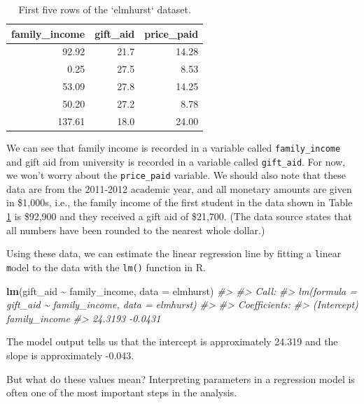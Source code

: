 \documentclass[
  10pt,
  openany]{book}
\newenvironment{Shaded}{\begin{snugshade}}{\end{snugshade}}
\newcommand{\AttributeTok}[1]{\textcolor[rgb]{0.13,0.29,0.53}{#1}}
\newcommand{\CommentTok}[1]{\textcolor[rgb]{0.56,0.35,0.01}{\textit{#1}}}
\newcommand{\FunctionTok}[1]{\textcolor[rgb]{0.13,0.29,0.53}{\textbf{#1}}}
\newcommand{\NormalTok}[1]{#1}
\newcommand{\SpecialCharTok}[1]{\textcolor[rgb]{0.81,0.36,0.00}{\textbf{#1}}}
\theoremstyle{definition}
\theoremstyle{definition}
\theoremstyle{definition}
\theoremstyle{definition}
\theoremstyle{remark}
\begin{document}
\begin{table}
\centering
\caption{\label{tab:elmhurst-data}First five rows of the `elmhurst` dataset.}
\centering
\begin{tabular}[t]{r|r|r}
\hline
family\_income & gift\_aid & price\_paid\\
\hline
92.92 & 21.7 & 14.28\\
\hline
0.25 & 27.5 & 8.53\\
\hline
53.09 & 27.8 & 14.25\\
\hline
50.20 & 27.2 & 8.78\\
\hline
137.61 & 18.0 & 24.00\\
\hline
\end{tabular}
\end{table}

We can see that family income is recorded in a variable called \texttt{family\_income} and gift aid from university is recorded in a variable called \texttt{gift\_aid}.
For now, we won't worry about the \texttt{price\_paid} variable.
We should also note that these data are from the 2011-2012 academic year, and all monetary amounts are given in \$1,000s, i.e., the family income of the first student in the data shown in Table \ref{tab:elmhurst-data} is \$92,900 and they received a gift aid of \$21,700. (The data source states that all numbers have been rounded to the nearest whole dollar.)

Using these data, we can estimate the linear regression line by fitting a \texttt{l}inear \texttt{m}odel to the data with the \texttt{lm()} function in R.

\begin{Shaded}
\begin{Highlighting}[]
\FunctionTok{lm}\NormalTok{(gift\_aid }\SpecialCharTok{\textasciitilde{}}\NormalTok{ family\_income, }\AttributeTok{data =}\NormalTok{ elmhurst)}
\CommentTok{\#\textgreater{} }
\CommentTok{\#\textgreater{} Call:}
\CommentTok{\#\textgreater{} lm(formula = gift\_aid \textasciitilde{} family\_income, data = elmhurst)}
\CommentTok{\#\textgreater{} }
\CommentTok{\#\textgreater{} Coefficients:}
\CommentTok{\#\textgreater{}   (Intercept)  family\_income  }
\CommentTok{\#\textgreater{}       24.3193        {-}0.0431}
\end{Highlighting}
\end{Shaded}

The model output tells us that the intercept is approximately 24.319 and the slope is approximately -0.043.

But what do these values mean?
Interpreting parameters in a regression model is often one of the most important steps in the analysis.
\end{document}
